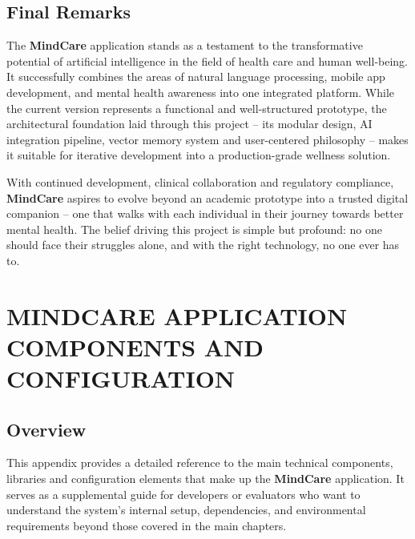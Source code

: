 \documentclass[a4paper,12pt]{report}
\begin{document}
\section{Final Remarks}
The \textbf{MindCare} application stands as a testament to the transformative potential of artificial intelligence in the field of health care and human well-being. It successfully combines the areas of natural language processing, mobile app development, and mental health awareness into one integrated platform. While the current version represents a functional and well-structured prototype, the architectural foundation laid through this project -- its modular design, AI integration pipeline, vector memory system and user-centered philosophy -- makes it suitable for iterative development into a production-grade wellness solution.

With continued development, clinical collaboration and regulatory compliance, \textbf{MindCare} aspires to evolve beyond an academic prototype into a trusted digital companion -- one that walks with each individual in their journey towards better mental health. The belief driving this project is simple but profound: no one should face their struggles alone, and with the right technology, no one ever has to.

\appendix
\chapter{MINDCARE APPLICATION COMPONENTS AND CONFIGURATION}
\section{Overview}
This appendix provides a detailed reference to the main technical components, libraries and configuration elements that make up the \textbf{MindCare} application. It serves as a supplemental guide for developers or evaluators who want to understand the system's internal setup, dependencies, and environmental requirements beyond those covered in the main chapters.
\end{document}
